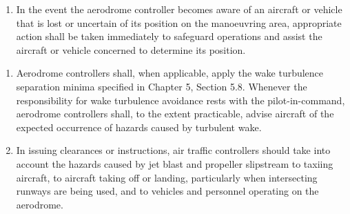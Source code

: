 \begin{enumeratesc}
\begin{enumerate}

        \item In the event the aerodrome controller becomes aware of an aircraft or vehicle that is lost or uncertain of its position on the manoeuvring area, appropriate action shall be taken immediately to safeguard operations and assist the aircraft or vehicle concerned to determine its position.
    \end{enumerate}

    \begin{enumerate}
        \item Aerodrome controllers shall, when applicable, apply the wake turbulence separation minima specified in Chapter 5, Section 5.8. Whenever the responsibility for wake turbulence avoidance rests with the pilot-in-command, aerodrome controllers shall, to the extent practicable, advise aircraft of the expected occurrence of hazards caused by turbulent wake.
        \item In issuing clearances or instructions, air traffic controllers should take into account the hazards caused by jet blast and propeller slipstream to taxiing aircraft, to aircraft taking off or landing, particularly when intersecting runways are being used, and to vehicles and personnel operating on the aerodrome.
    \end{enumerate}


\end{enumeratesc}
